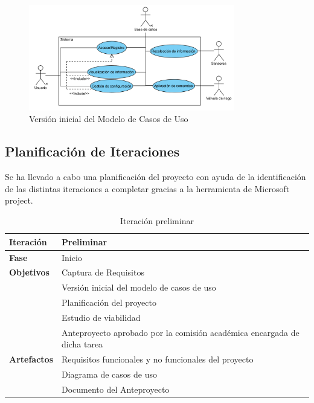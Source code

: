 \begin{figure}[htb]
	\centering
	\includegraphics[width=0.80\textwidth]{figs/Modelos/tfg-DCU-00.png}
	\caption[Modelo de Casos de Uso Inicial]{Versión inicial del Modelo de Casos de Uso}
	\label{fig:tfg-DCU-00}
\end{figure}

\FloatBarrier
\subsection{Planificación de Iteraciones}
\label{subsec:Resultados.Inicio.Planificación}

Se ha llevado a cabo una planificación del proyecto con ayuda de la identificación de las distintas iteraciones a completar gracias a la herramienta de Microsoft project.

\begin{table}[hbt]
    \centering
    \caption{Iteración preliminar}
    \label{tab:resultados.planificacion.iter.pre}
    \begin{tabular}[t]{| l || p{8cm} |}
        \hline
        \textbf{Iteración} & Preliminar \\ \hline
        \textbf{Fase} & Inicio \\ \hline
        \multirow{1}{*}{\textbf{Objetivos}}
        & Captura de Requisitos \\ \cline{2-2}
        & Versión inicial del modelo de casos de uso \\ \cline{2-2}
        & Planificación del proyecto \\ \cline{2-2}
        & Estudio de viabilidad \\ \cline{2-2}
        & Anteproyecto aprobado por la comisión académica encargada de dicha tarea \\ \hline
        \multirow{1}{*}{\textbf{Artefactos}}
        & Requisitos funcionales y no funcionales del proyecto \\ \cline{2-2}
        & Diagrama de casos de uso \\ \cline{2-2}
        & Documento del Anteproyecto \\
        \hline
    \end{tabular}
\end{table}

